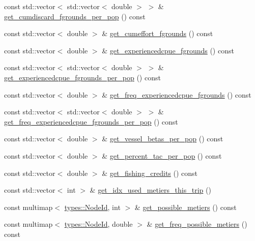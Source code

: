 \begin{DoxyCompactItemize}
\item 
const std\+::vector$<$ std\+::vector$<$ double $>$ $>$ \& \mbox{\hyperlink{class_vessel_a671abe1c5598dc0ebff902288857ab49}{get\+\_\+cumdiscard\+\_\+fgrounds\+\_\+per\+\_\+pop}} () const
\item 
const std\+::vector$<$ double $>$ \& \mbox{\hyperlink{class_vessel_ac2056919cd524252882e35471c09a336}{get\+\_\+cumeffort\+\_\+fgrounds}} () const
\item 
const std\+::vector$<$ double $>$ \& \mbox{\hyperlink{class_vessel_a996a55689cf78c1c2c05107251d6076e}{get\+\_\+experiencedcpue\+\_\+fgrounds}} () const
\item 
const std\+::vector$<$ std\+::vector$<$ double $>$ $>$ \& \mbox{\hyperlink{class_vessel_a78395a2b96237c8b78b73205825f2154}{get\+\_\+experiencedcpue\+\_\+fgrounds\+\_\+per\+\_\+pop}} () const
\item 
const std\+::vector$<$ double $>$ \& \mbox{\hyperlink{class_vessel_aa3f3c243856abffe99ac98f287037304}{get\+\_\+freq\+\_\+experiencedcpue\+\_\+fgrounds}} () const
\item 
const std\+::vector$<$ std\+::vector$<$ double $>$ $>$ \& \mbox{\hyperlink{class_vessel_ae60016470cb4f11299d23f0b11398b1d}{get\+\_\+freq\+\_\+experiencedcpue\+\_\+fgrounds\+\_\+per\+\_\+pop}} () const
\item 
const std\+::vector$<$ double $>$ \& \mbox{\hyperlink{class_vessel_aaa20a9d93a8f2a071e0a9c64748fff89}{get\+\_\+vessel\+\_\+betas\+\_\+per\+\_\+pop}} () const
\item 
const std\+::vector$<$ double $>$ \& \mbox{\hyperlink{class_vessel_a50b8cb9ce1063cfb0cef8b2855264f46}{get\+\_\+percent\+\_\+tac\+\_\+per\+\_\+pop}} () const
\item 
const std\+::vector$<$ double $>$ \& \mbox{\hyperlink{class_vessel_a41561e528d1c3253a393be9bd93a9423}{get\+\_\+fishing\+\_\+credits}} () const
\item 
const std\+::vector$<$ int $>$ \& \mbox{\hyperlink{class_vessel_aa9fb6e152000be882ad2ad19070f7565}{get\+\_\+idx\+\_\+used\+\_\+metiers\+\_\+this\+\_\+trip}} ()
\item 
const multimap$<$ \mbox{\hyperlink{classtypes_1_1_node_id}{types\+::\+Node\+Id}}, int $>$ \& \mbox{\hyperlink{class_vessel_a988c875078c2347fdc1a1e50123f04c6}{get\+\_\+possible\+\_\+metiers}} () const
\item 
const multimap$<$ \mbox{\hyperlink{classtypes_1_1_node_id}{types\+::\+Node\+Id}}, double $>$ \& \mbox{\hyperlink{class_vessel_a04b83746d403ca9f0a029343a39112be}{get\+\_\+freq\+\_\+possible\+\_\+metiers}} () const

\end{DoxyCompactItemize}
